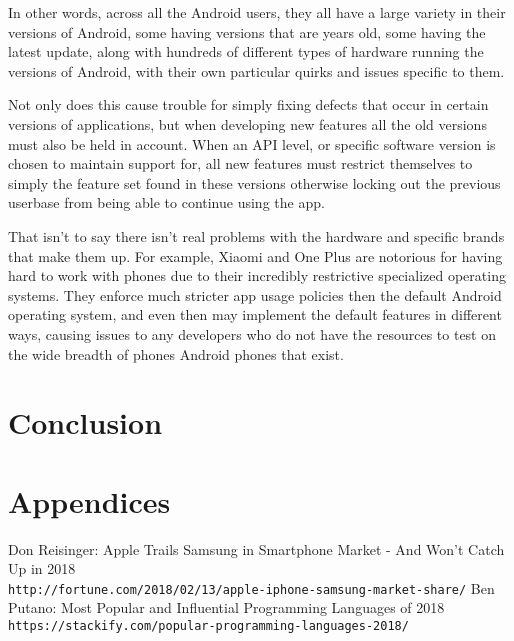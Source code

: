 \documentclass[12pt, letterpaper]{article}
\begin{document}
In other words, across all the Android users, they all have a large variety
in their versions of Android, some having versions that are years old,
some having the latest update, along with hundreds of different types of
hardware running the versions of Android, with their own particular quirks
and issues specific to them.

Not only does this cause trouble for simply fixing defects that occur in
certain versions of applications, but when developing new features all the
old versions must also be held in account. When an API level, or specific
software version is chosen to maintain support for, all new features must
restrict themselves to simply the feature set found in these versions
otherwise locking out the previous userbase from being able to continue
using the app.

That isn't to say there isn't real problems with the hardware and specific
brands that make them up. For example, Xiaomi and One Plus are notorious
for having hard to work with phones due to their incredibly restrictive
specialized operating systems. They enforce much stricter app usage policies
then the default Android operating system, and even then may implement the
default features in different ways, causing issues to any developers who
do not have the resources to test on the wide breadth of phones Android
phones that exist.

\section{Conclusion}

\section{Appendices}

\begin{thebibliography}{9}
Don Reisinger: Apple Trails Samsung in Smartphone Market - And Won't Catch Up in 2018
\\\texttt{http://fortune.com/2018/02/13/apple-iphone-samsung-market-share/}
Ben Putano: Most Popular and Influential Programming Languages of 2018
\\\texttt{https://stackify.com/popular-programming-languages-2018/}
\end{thebibliography}
\end{document}
